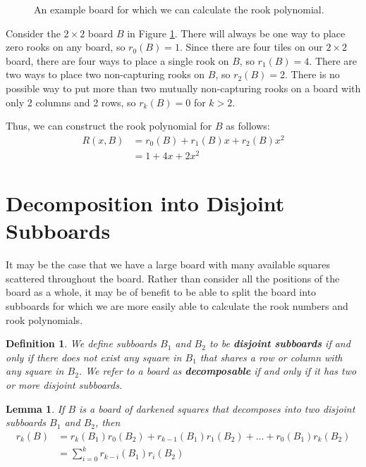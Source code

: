 \documentclass{article}
\newcommand{\w}{0.5}
\newcommand{\shadesquare}[2]{\filldraw[fill=gray!40!white, draw=black] (#1*\w - \w,#2*\w - \w) rectangle (#1*\w,#2*\w);}
\newtheorem{definition}{Definition}
\newtheorem{lemma}{Lemma}
\begin{document}
\begin{figure}[!h]
    \centering
    \caption{An example board for which we can calculate the rook polynomial.}
    \label{2by2}
\end{figure}

Consider the $2\times2$ board $B$ in Figure \ref{2by2}. There will always be one way to place zero rooks on any board, so $r_0(B) = 1$. Since there are four tiles on our $2 \times 2$ board, there are four ways to place a single rook on $B$, so $r_1(B) = 4$. There are two ways to place two non-capturing rooks on $B$, so $r_2(B) = 2$. There is no possible way to put more than two mutually non-capturing rooks on a board with only 2 columns and 2 rows, so $r_k(B) = 0$ for $k>2$.

Thus, we can construct the rook polynomial for $B$ as follows:
\begin{align*}
R(x,B) &= r_0(B) + r_1(B)x + r_2(B)x^2 \\
& = 1 + 4x + 2x^2
\end{align*}

\pagebreak
\section{Decomposition into Disjoint Subboards} \label{decomposable}
It may be the case that we have a large board with many available squares scattered throughout the board. Rather than consider all the positions of the board as a whole, it may be of benefit to be able to split the board into subboards for which we are more easily able to calculate the rook numbers and rook polynomials.

\begin{definition}
    We define subboards $B_1$ and $B_2$ to be \textbf{disjoint subboards} if and only if there does not exist any square in $B_1$ that shares a row or column with any square in $B_2$. We refer to a board as \textbf{decomposable} if and only if it has two or more disjoint subboards.
\end{definition}

\begin{lemma}
    If $B$ is a board of darkened squares that decomposes into two disjoint subboards $B_1$ and $B_2$, then
    \begin{equation}\begin{split} \label{lem1}
        r_k(B) &= r_k(B_1)r_0(B_2) + r_{k-1}(B_1)r_1(B_2) + ... + r_0(B_1)r_k(B_2) \\
        &= \sum_{i=0}^{k}r_{k-i}(B_1)r_i(B_2)
    \end{split}\end{equation}
\end{lemma}
\end{document}

